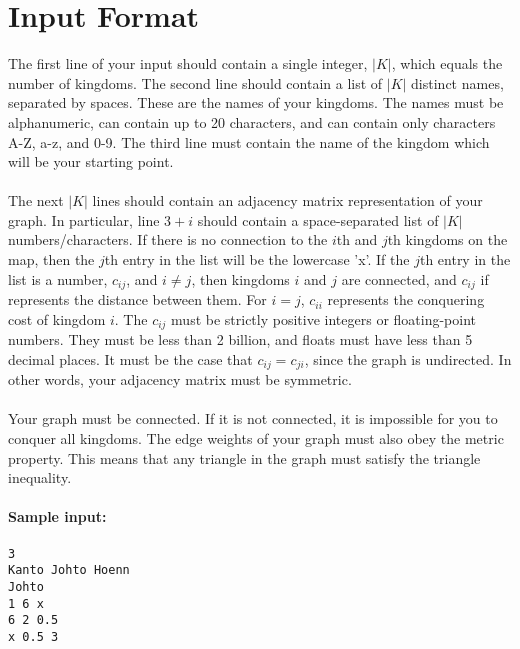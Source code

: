 \documentclass{article}
\begin{document}
\section*{Input Format}

The first line of your input should contain a single integer, $|K|$, which equals the number of kingdoms. The second line should contain a list of $|K|$ distinct names, separated by spaces. These are the names of your kingdoms. The names must be alphanumeric, can contain up to 20 characters, and can contain only characters A-Z, a-z, and 0-9. The third line must contain the name of the kingdom which will be your starting point.
\\ \\
The next $|K|$ lines should contain an adjacency matrix representation of your graph. In particular, line $3 + i$ should contain a space-separated list of $|K|$ numbers/characters. If there is no connection to the $i$th and $j$th kingdoms on the map, then the $j$th entry in the list will be the lowercase 'x'. If the $j$th entry in the list is a number, $c_{ij}$, and $i \neq j$, then kingdoms $i$ and $j$ are connected, and $c_{ij}$ if represents the distance between them. For $i = j$, $c_{ii}$ represents the conquering cost of kingdom $i$. The $c_{ij}$ must be strictly positive integers or floating-point numbers. They must be less than 2 billion, and floats must have less than 5 decimal places. It must be the case that $c_{ij} = c_{ji}$, since the graph is undirected. In other words, your adjacency matrix must be symmetric.
\\ \\
Your graph must be connected. If it is not connected, it is impossible for you to conquer all kingdoms. The edge weights of your graph must also obey the metric property. This means that any triangle in the graph must satisfy the triangle inequality.

\paragraph{Sample input:}
\begin{verbatim}
3
Kanto Johto Hoenn
Johto
1 6 x
6 2 0.5
x 0.5 3
\end{verbatim}
\end{document}
